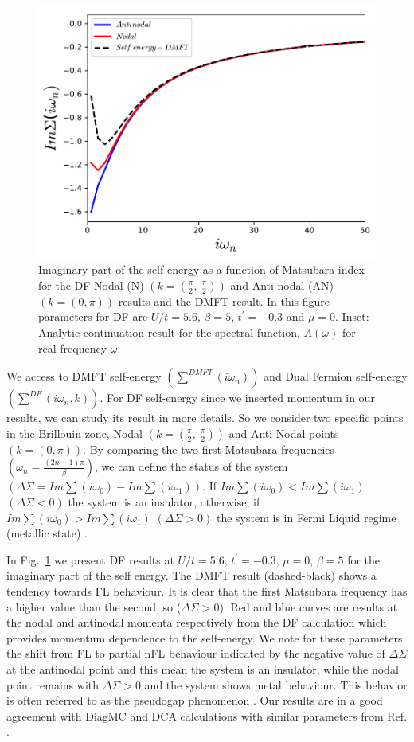 \begin{figure}[ht]
\centering
    \includegraphics[width=0.9\linewidth]{fig3/selfenergy.pdf}
\caption {Imaginary part of the self energy as a function of Matsubara index for the DF Nodal (N) $(k= (\frac{\pi}{2},\: \frac{\pi}{2}))$ and Anti-nodal (AN) $(k= (0, \pi))$ results and the DMFT result. In this figure parameters for DF are  $U/t=5.6$, $\beta =5$, $t^\prime =-0.3$ and $\mu=0$.  Inset: Analytic continuation result for the spectral function, $A(\omega)$ for real frequency $\omega$.
\label{fig:Self_ Energy}}
\end{figure}

We access to DMFT self-energy $(\sum ^{DMFT} (i\omega _n))$ and Dual Fermion self-energy $(\sum ^ {DF} (i\omega _n, k))$. For DF self-energy since we inserted momentum in our results, we can study its result in more details. So we consider two specific points in the Brillouin zone, Nodal $(k= (\frac{\pi}{2},\: \frac{\pi}{2}))$ and Anti-Nodal points $(k= (0, \pi))$. By comparing the two first Matsubara frequencies $(\omega _n = \frac{(2n +1) \pi}{\beta})$, we can define the status of the system $(\Delta\Sigma=Im \sum (i\omega _0) - Im \sum (i\omega _1))$. If $Im \sum (i\omega _0) < Im \sum (i\omega _1)$ $(\Delta\Sigma<0)$ the system is an insulator, otherwise, if $Im \sum (i\omega _0) > Im \sum (i\omega _1)$ $(\Delta\Sigma>0)$ the system is in Fermi Liquid regime (metallic state) \cite{Geles, Wei}.

In Fig.~\ref{fig:Self_ Energy} we present DF results at $U/t=5.6$, $t^\prime=-0.3$, $\mu=0$, $\beta =5$ for the imaginary part of the self energy. The DMFT result (dashed-black) shows a tendency towards FL behaviour. It is clear that the first Matsubara frequency has a higher value than the second, so ($\Delta \Sigma > 0$).  Red and blue curves are results at the nodal and antinodal momenta respectively from the DF calculation which provides momentum dependence to the self-energy. 
We note for these parameters the shift from FL to partial nFL behaviour indicated by the negative value of $\Delta \Sigma$ at the antinodal point and this mean the system is an insulator, while the nodal point remains with $\Delta \Sigma >0$ and the system shows metal behaviour. This behavior is often referred to as the pseudogap phenomenon \cite{Valli, Rice}.
Our results are in a good agreement with  DiagMC and DCA calculations with similar parameters from  Ref. \cite{Wei}. 
 
